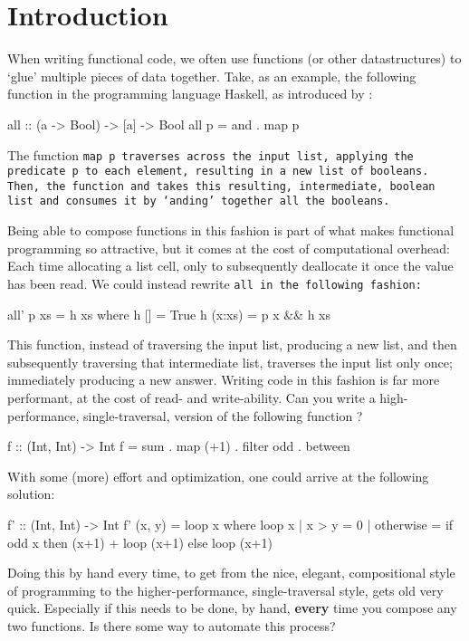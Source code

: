 \section{Introduction}
When writing functional code, we often use functions (or other datastructures) to `glue' multiple pieces of data together.
Take, as an example, the following function in the programming language Haskell, as introduced by \cite{Gill1993}: %
\begin{code}
    all :: (a -> Bool) -> [a] -> Bool
    all p = and . map p
\end{code}
The function \tt{map p} traverses across the input list, applying the predicate \tt{p} to each element, resulting in a new list of booleans. Then, the function \tt{and} takes this resulting, intermediate, boolean list and consumes it by `anding' together all the booleans.

Being able to compose functions in this fashion is part of what makes functional programming so attractive, but it comes at the cost of computational overhead:
Each time allocating a list cell, only to subsequently deallocate it once the value has been read.
We could instead rewrite \tt{all} in the following fashion:
\begin{code}
all' p xs = h xs
      where h []     = True
            h (x:xs) = p x && h xs
\end{code}
This function, instead of traversing the input list, producing a new list, and then subsequently traversing that intermediate list, traverses the input list only once; immediately producing a new answer.
Writing code in this fashion is far more performant, at the cost of read- and write-ability.
Can you write a high-performance, single-traversal, version of the following function \citep{Harper2011}?
\begin{code}
    f :: (Int, Int) -> Int
    f = sum . map (+1) . filter odd . between
\end{code}
With some (more) effort and optimization, one could arrive at the following solution:
\begin{code}
    f' :: (Int, Int) -> Int
    f' (x, y) = loop x
      where loop x | x > y     = 0
                   | otherwise = if odd x
                                 then (x+1) + loop (x+1)
                                 else loop (x+1)
\end{code}
Doing this by hand every time, to get from the nice, elegant, compositional style of programming to the higher-performance, single-traversal style, gets old very quick.
Especially if this needs to be done, by hand, \textbf{every} time you compose any two functions.
Is there some way to automate this process?

